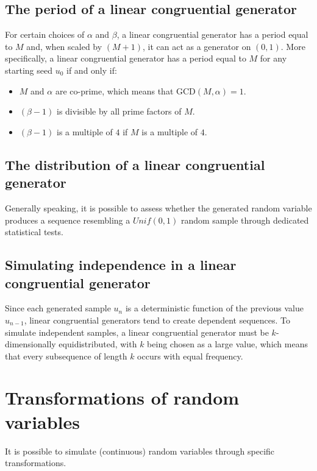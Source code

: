 \documentclass{report}
\begin{document}
\subsection{The period of a linear congruential generator}
For certain choices of $\displaystyle \alpha$ and $\displaystyle \beta$, a linear congruential generator has a period equal to $\displaystyle M$ and, when scaled by $\displaystyle (M + 1)$, it can act as a generator on $\displaystyle (0, 1)$. \newline
More specifically, a linear congruential generator has a period equal to $\displaystyle M$ for any starting seed $\displaystyle u_0$ if and only if:
\begin{itemize}
    \item $\displaystyle M$ and $\displaystyle \alpha$ are co-prime, which means that $\displaystyle \text{GCD}(M, \alpha) = 1$.
    \item $\displaystyle (\beta - 1)$ is divisible by all prime factors of $\displaystyle M$.
    \item $\displaystyle (\beta - 1)$ is a multiple of $\displaystyle 4$ if $\displaystyle M$ is a multiple of $\displaystyle 4$.
\end{itemize}
\subsection{The distribution of a linear congruential generator}
Generally speaking, it is possible to assess whether the generated random variable produces a sequence resembling a $\displaystyle Unif(0, 1)$ random sample through dedicated statistical tests.
\subsection{Simulating independence in a linear congruential generator}
Since each generated sample $\displaystyle u_n$ is a deterministic function of the previous value $\displaystyle u_{n - 1}$, linear congruential generators tend to create dependent sequences. \newline
To simulate independent samples, a linear congruential generator must be $\displaystyle k$-dimensionally equidistributed, with $\displaystyle k$ being chosen as a large value, which means that every subsequence of length $\displaystyle k$ occurs with equal frequency.
\section{Transformations of random variables}
It is possible to simulate (continuous) random variables through specific transformations.
\end{document}
